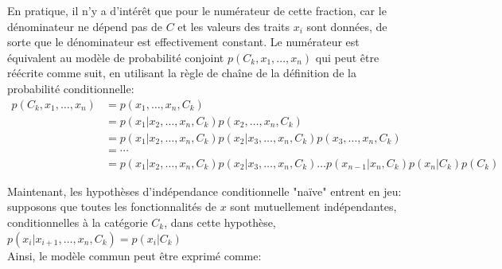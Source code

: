 En pratique, il n'y a d'intérêt que pour le numérateur de cette fraction, car le dénominateur ne dépend pas de $C$ et les valeurs des traits $x_ {i}$ sont données, de sorte que le dénominateur est effectivement constant. Le numérateur est équivalent au modèle de probabilité conjoint ${p(C_{k},x_{1},...,x_{n})}$ qui peut être réécrite comme suit, en utilisant la règle de chaîne de la définition de la probabilité conditionnelle:
\begin{equation}
    \begin{aligned}
        p\left(C_{k}, x_{1}, \ldots, x_{n}\right) & =p\left(x_{1}, \ldots, x_{n}, C_{k}\right)                                                                                                                                                       \\
                                                  & =p\left(x_{1} | x_{2}, \ldots, x_{n}, C_{k}\right) p\left(x_{2}, \ldots, x_{n}, C_{k}\right)                                                                                                     \\
                                                  & =p\left(x_{1} | x_{2}, \ldots, x_{n}, C_{k}\right) p\left(x_{2} | x_{3}, \ldots, x_{n}, C_{k}\right) p\left(x_{3}, \ldots, x_{n}, C_{k}\right)                                                   \\
                                                  & =\cdots                                                                                                                                                                                          \\
                                                  & =p\left(x_{1} | x_{2}, \ldots, x_{n}, C_{k}\right) p\left(x_{2} | x_{3}, \ldots, x_{n}, C_{k}\right) \ldots p\left(x_{n-1} | x_{n}, C_{k}\right) p\left(x_{n} | C_{k}\right) p\left(C_{k}\right)
    \end{aligned}
\end{equation}

Maintenant, les hypothèses d'indépendance conditionnelle "naïve" entrent en jeu: supposons que toutes les fonctionnalités de $x$ sont mutuellement indépendantes, conditionnelles à la catégorie $C_{k}$, dans cette hypothèse, $
    p\left(x_{i} | x_{i+1}, \ldots, x_{n}, C_{k}\right)=p\left(x_{i} | C_{k}\right)
$ \\

Ainsi, le modèle commun peut être exprimé comme:

